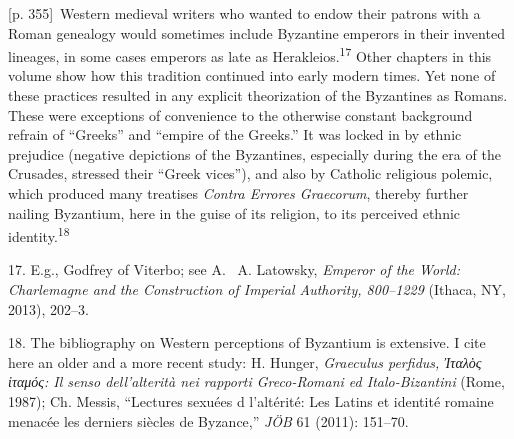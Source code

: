 \documentclass[10pt,a4paper]{article}
\begin{document}
{\scriptsize\color{gray}[p. 355]}\ Western medieval writers who wanted to endow their patrons with a Roman genealogy would sometimes include Byzantine emperors in their invented lineages, in some cases emperors as late as Herakleios.\nobreak\textsuperscript{17} Other chapters in this volume show how this tradition continued into early modern times. Yet none of these practices resulted in any explicit theorization of the Byzantines as Romans. These were exceptions of convenience to the otherwise constant background refrain of “Greeks” and “empire of the Greeks.” It was locked in by ethnic prejudice (negative depictions of the Byzantines, especially during the era of the Crusades, stressed their “Greek vices”), and also by Catholic religious polemic, which produced many treatises \textit{Contra Errores Graecorum}, thereby further nailing Byzantium, here in the guise of its religion, to its perceived ethnic identity.\nobreak\textsuperscript{18}\par{\small 17.  E.g., Godfrey of Viterbo; see A.  A. Latowsky, \textit{Emperor of the World: Charlemagne and the Construction of Imperial Authority, 800–1229} (Ithaca, NY, 2013), 202–3.\par}{\small 18.  The bibliography on Western perceptions of Byzantium is extensive. I cite here an older and a more recent study: H. Hunger, \textit{Graeculus perfidus, Ἰταλὸς ἰταμός: Il senso dell’alterità nei rapporti Greco-Romani ed Italo-Bizantini} (Rome, 1987); Ch. Messis, “Lectures sexuées d l’altérité: Les Latins et identité romaine menacée les derniers siècles de Byzance,”\textit{ JÖB} 61 (2011): 151–70.\par}
\end{document}
